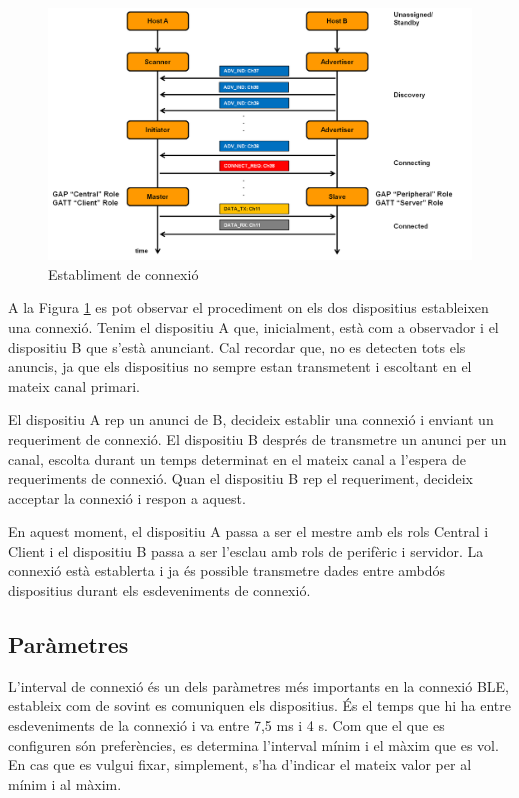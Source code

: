 \begin{figure}[!h]
	\begin{center}
		\includegraphics[width=1\textwidth]{./images/rols_unicast.png}
		\caption{Establiment de connexió \cite{fig:connection_establishement}}
		\label{fig:unicast_roles}
	\end{center}
\end{figure}


A la Figura \ref{fig:unicast_roles} es pot observar el procediment on els dos dispositius estableixen una connexió.
Tenim el dispositiu A que, inicialment, està com a observador i el dispositiu B que s'està anunciant.
Cal recordar que, no es detecten tots els anuncis, ja que els dispositius no sempre estan transmetent i escoltant en el mateix canal primari.

El dispositiu A rep un anunci de B, decideix establir una connexió i enviant un requeriment de connexió.
El dispositiu B després de transmetre un anunci per un canal, escolta durant un temps determinat en el mateix canal a l'espera de requeriments de connexió.
Quan el dispositiu B rep el requeriment, decideix acceptar la connexió i respon a aquest.

En aquest moment, el dispositiu A passa a ser el mestre amb els rols Central i Client i el dispositiu B passa a ser l'esclau amb rols de perifèric i servidor.
La connexió està establerta i ja és possible transmetre dades entre ambdós dispositius durant els esdeveniments de connexió. 


\subsection{Paràmetres}
\label{sec:params}
L'interval de connexió és un dels paràmetres més importants en la connexió BLE, estableix com de sovint es comuniquen els dispositius.
És el temps que hi ha entre esdeveniments de la connexió i va entre 7,5 ms i 4 s.
Com que el que es configuren són preferències, es determina l'interval mínim i el màxim que es vol.
En cas que es vulgui fixar, simplement, s'ha d'indicar el mateix valor per al mínim i al màxim.

